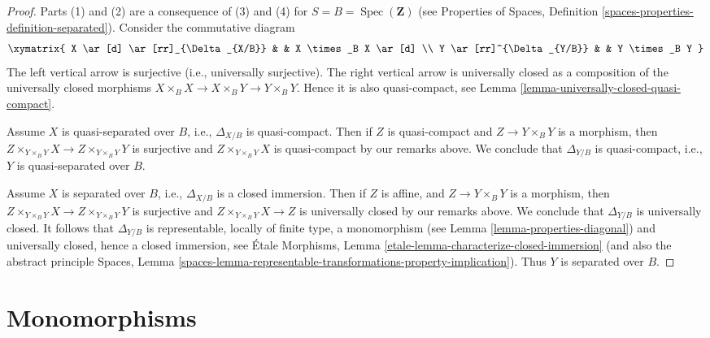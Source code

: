 \documentclass{stacks-project}
\theoremstyle{plain}
\theoremstyle{definition}
\theoremstyle{remark}
\numberwithin{equation}{subsection}
\def\Spec{\mathop{\mathrm{Spec}}}
\begin{document}
\begin{proof}
Parts (1) and (2) are a consequence of (3) and (4) for
$S = B = \Spec(\mathbf{Z})$ (see
Properties of Spaces,
Definition \ref{spaces-properties-definition-separated}).
Consider the commutative diagram
$$
\xymatrix{
X \ar[d] \ar[rr]_{\Delta_{X/B}} & & X \times_B X \ar[d] \\
Y \ar[rr]^{\Delta_{Y/B}} & & Y \times_B Y
}
$$
The left vertical arrow is surjective (i.e., universally surjective).
The right vertical arrow is universally closed as a composition
of the universally closed morphisms
$X \times_B X \to X \times_B Y \to Y \times_B Y$. Hence it is also
quasi-compact, see
Lemma \ref{lemma-universally-closed-quasi-compact}.

\medskip\noindent
Assume $X$ is quasi-separated over $B$, i.e.,  $\Delta_{X/B}$ is
quasi-compact. Then if $Z$ is quasi-compact and $Z \to Y \times_B Y$ is
a morphism, then $Z \times_{Y \times_B Y} X \to Z \times_{Y \times_B Y} Y$
is surjective and $Z \times_{Y \times_B Y} X$ is quasi-compact by our remarks
above. We conclude that $\Delta_{Y/B}$ is quasi-compact, i.e., $Y$
is quasi-separated over $B$.

\medskip\noindent
Assume $X$ is separated over $B$, i.e., $\Delta_{X/B}$ is a closed
immersion. Then if $Z$ is affine, and $Z \to Y \times_B Y$ is
a morphism, then $Z \times_{Y \times_B Y} X \to Z \times_{Y \times_B Y} Y$
is surjective and $Z \times_{Y \times_B Y} X \to Z$ is universally closed
by our remarks above. We conclude that $\Delta_{Y/B}$ is universally closed.
It follows that $\Delta_{Y/B}$ is representable, locally of finite type, a
monomorphism (see
Lemma \ref{lemma-properties-diagonal})
and universally closed, hence a closed immersion, see
\'Etale Morphisms,
Lemma \ref{etale-lemma-characterize-closed-immersion}
(and also the abstract principle
Spaces, Lemma
\ref{spaces-lemma-representable-transformations-property-implication}).
Thus $Y$ is separated over $B$.
\end{proof}













\section{Monomorphisms}
\label{section-monomorphisms}
\end{document}
